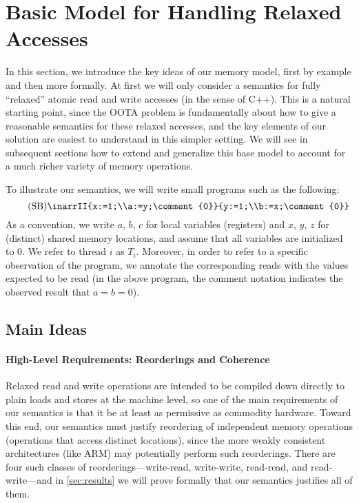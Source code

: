 \section{Basic Model for Handling Relaxed Accesses}
\label{sec:relaxed}

In this section, we introduce the key ideas of our memory model, first
by example and then more formally.  At first we will only consider a
semantics for fully ``relaxed'' atomic read and write accesses (in the
sense of C++).  This is a natural starting point, since the OOTA
problem is fundamentally about how to give a reasonable semantics for
these relaxed accesses, and the key elements of our solution are
easiest to understand in this simpler setting.  We will see in
subsequent sections how to extend and generalize this base model to
account for a much richer variety of memory operations.

To illustrate our semantics, we will write small programs such as the
following:
\begin{equation}\label{eq:SB}\tag{SB}
\inarrII{x:=1;\\a:=y;\comment{0}}{y:=1;\\b:=x;\comment{0}}
\end{equation}
As a convention, we write $a$, $b$, $c$ for local variables
(registers) and $x$, $y$, $z$ for (distinct) shared memory locations,
and assume that all variables are initialized to $0$.  
We refer to thread $i$ as $T_i$.  Moreover, in order to
refer to a specific observation of the program, we annotate the
corresponding reads with the values expected to be read (\eg in the
above program, the comment notation indicates the observed result that
$a = b = 0$).

\subsection{Main Ideas}

\paragraph{High-Level Requirements: Reorderings and Coherence}

Relaxed read and write operations are intended to be compiled down
directly to plain loads and stores at the machine level, so one of the
main requirements of our semantics is that it be at least as
permissive as commodity hardware.  Toward this end, our semantics must
justify reordering of independent memory operations (\ie operations
that access distinct locations), since the more weakly consistent
architectures (like ARM) may potentially perform such reorderings.
There are four such classes of reorderings---write-read, write-write,
read-read, and read-write---and in \cref{sec:results} we will prove formally
that our semantics justifies all of them.

